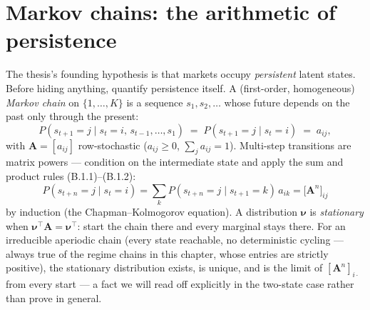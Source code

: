 \documentclass[11pt]{article}
\numberwithin{equation}{section}
\theoremstyle{plain}
\theoremstyle{definition}
\theoremstyle{remark}
\newcommand{\T}{\top}
\newcommand{\bA}{\bm{A}}
\newcommand{\bnu}{\bm{\nu}}
\begin{document}
\section{Markov chains: the arithmetic of persistence}\label{sec:markov}

The thesis's founding hypothesis is that markets occupy \emph{persistent} latent states. Before hiding anything, quantify persistence itself. A (first-order, homogeneous) \emph{Markov chain} on $\{1, \dots, K\}$ is a sequence $s_1, s_2, \dots$ whose future depends on the past only through the present:
\begin{equation}
P(s_{t+1} = j \mid s_t = i,\, s_{t-1}, \dots, s_1) \;=\; P(s_{t+1} = j \mid s_t = i) \;=\; a_{ij},
\label{eq:markovdef}
\end{equation}
with $\bA = [a_{ij}]$ row-stochastic ($a_{ij} \ge 0$, $\sum_j a_{ij} = 1$). Multi-step transitions are matrix powers --- condition on the intermediate state and apply the sum and product rules (B.1.1)--(B.1.2):
\begin{equation}
P(s_{t+n} = j \mid s_t = i)
= \sum_{k} P(s_{t+n} = j \mid s_{t+1} = k)\, a_{ik}
= \big[\bA^n\big]_{ij}
\label{eq:chapman}
\end{equation}
by induction (the Chapman--Kolmogorov equation). A distribution $\bnu$ is \emph{stationary} when $\bnu^\T \bA = \bnu^\T$: start the chain there and every marginal stays there. For an irreducible aperiodic chain (every state reachable, no deterministic cycling --- always true of the regime chains in this chapter, whose entries are strictly positive), the stationary distribution exists, is unique, and is the limit of $[\bA^n]_{i\cdot}$ from every start --- a fact we will read off explicitly in the two-state case rather than prove in general.
\end{document}
